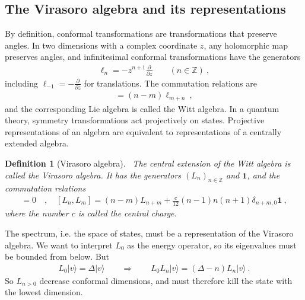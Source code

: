 \documentclass[12pt, a4paper]{article}
\theoremstyle{break}
\newtheorem{defn}[exo]{Definition}
\begin{document}
\subsection{The Virasoro algebra and its representations}

By definition, conformal transformations are transformations that preserve angles. 
In two dimensions with a complex coordinate $z$, any holomorphic map preserves angles, and 
infinitesimal conformal transformations have the generators
\begin{align}
 \ell_n = -z^{n+1}\frac{\partial}{\partial z}\qquad (n\in\mathbb{Z})\ ,
\end{align}
including $\ell_{-1}=-\frac{\partial}{\partial z}$ for translations.
The  commutation relations are
\begin{align}
 [\ell_n,\ell_m ] = (n-m)\ell_{m+n}\ ,
\end{align}
and the corresponding Lie algebra is called the Witt algebra.
In a quantum theory, symmetry transformations act projectively on states. 
Projective representations of an algebra are equivalent to representations of a centrally extended algebra. 

\begin{defn}[Virasoro algebra]
 ~\label{def:vir}
 The central extension of the Witt algebra is called the Virasoro algebra. It has the generators $(L_n)_{n\in\mathbb{Z}}$ and $\mathbf 1$, and the commutation relations
 \begin{align}
  [\mathbf 1, L_n] = 0 \quad , \quad [L_n,L_m] = (n-m)L_{n+m} +\frac{c}{12}(n-1)n(n+1)\delta_{n+m,0}\mathbf 1 \ ,
  \label{eq:vir}
 \end{align}
 where the number $c$ is called the central charge. 
\end{defn}

The spectrum, i.e. the space of states, must be a representation of the Virasoro algebra.
We want to interpret $L_0$ as the energy operator, so its eigenvalues must be bounded from below. But 
\begin{align}
 L_0 |v\rangle = \Delta |v\rangle  \qquad \Rightarrow \qquad L_0 L_n|v\rangle =  (\Delta-n)L_n|v\rangle \ .
\end{align}
So $L_{n>0}$ decrease conformal dimensions, and must therefore kill the state with the lowest dimension. 
\end{document}
